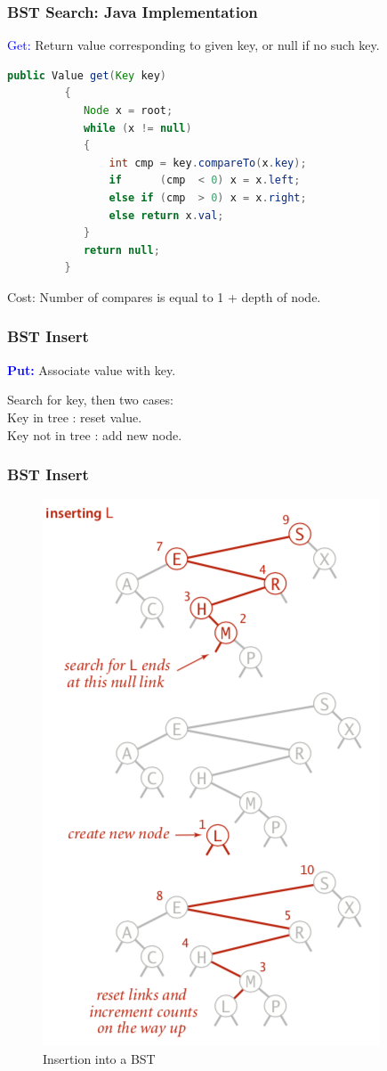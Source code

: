 \documentclass[11pt]{beamer}
\begin{document}
       \begin{frame}[fragile]
    	\frametitle{BST Search: Java Implementation}
    	\textcolor{blue}{Get: } Return value corresponding to given key, or null if no such key.
    	\begin{lstlisting}[language=Java]
        public Value get(Key key)
         {
         	Node x = root;
         	while (x != null)
         	{
         		int cmp = key.compareTo(x.key);
         		if      (cmp  < 0) x = x.left;
         		else if (cmp  > 0) x = x.right;
         		else return x.val;
         	}
         	return null;
         }
    	\end{lstlisting}
        \alert{Cost: Number of compares is equal to 1 + depth of node.}
    \end{frame}

     \begin{frame}[fragile]
     	\frametitle{BST Insert}
     	\textbf{\textcolor{blue}{Put:} }Associate value with key.\\
     	\begin{block}{Search for key, then two cases: } 
         	\\ Key in tree : reset value.
     		\\ Key not in tree : add new node.
     	\end{block}
     \end{frame}
 
      \begin{frame}[fragile]
     	\frametitle{BST Insert}
     	 \begin{figure}
     		\centering
     		\includegraphics[width=0.4\linewidth]{"Screenshot 2020-11-02 at 10.34.03 PM"}
     		\caption{Insertion into a BST}
     		\label{fig:screenshot-2020-11-02-at-10}
     	\end{figure}
     \end{frame}
 
\end{document}

